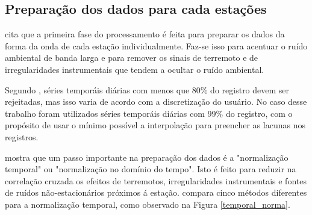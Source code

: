 \subsection{Preparação dos dados para cada estações}

\cite{bensen_processing_2007} cita que a primeira fase do processamento  é feita para preparar os dados da forma da onda de cada estação individualmente. Faz-se isso para acentuar o ruído ambiental de banda larga e para remover os sinais de terremoto e de irregularidades instrumentais que tendem a ocultar o ruído ambiental.

Segundo \cite{bensen_processing_2007}, séries temporáis diárias com menos que 80\% do registro devem ser rejeitadas, mas isso varia de acordo com a discretização do usuário. No caso desse trabalho foram utilizados séries  temporáis diárias com 99\% do registro, com o propósito de usar o mínimo possível a interpolação para preencher as lacunas nos registros.

\cite{bensen_processing_2007} mostra que um passo importante na preparação dos dados é a "normalização temporal" ou "normalização no domínio do tempo". Isto é feito para reduzir na correlação cruzada os efeitos de terremotos, irregularidades instrumentais e fontes de ruídos não-estacionários próximos á estação. \cite{bensen_processing_2007} compara cinco métodos diferentes para a normalização temporal, como observado na Figura \ref{temporal_norma}.

